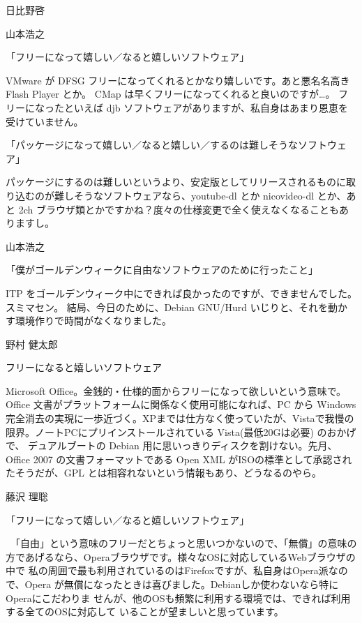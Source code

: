 \documentclass[cjk,dvipdfmx,12pt]{beamer}
\begin{document}
\begin{frame}{日比野啓}
\end{frame}\begin{frame}{山本浩之}

「フリーになって嬉しい／なると嬉しいソフトウェア」

VMware が DFSG フリーになってくれるとかなり嬉しいです。あと悪名名高き Flash Player とか。
CMap は早くフリーになってくれると良いのですが…。
フリーになったといえば djb ソフトウェアがありますが、私自身はあまり恩恵を受けていません。

「パッケージになって嬉しい／なると嬉しい／するのは難しそうなソフトウェア」

パッケージにするのは難しいというより、安定版としてリリースされるものに取り込むのが難しそうなソフトウェアなら、youtube-dl とか
nicovideo-dl とか、あと 2ch ブラウザ類とかですかね？度々の仕様変更で全く使えなくなることもありますし。

\end{frame}\begin{frame}{山本浩之}

「僕がゴールデンウィークに自由なソフトウェアのために行ったこと」

ITP をゴールデンウィーク中にできれば良かったのですが、できませんでした。スミマセン。
結局、今日のために、Debian GNU/Hurd いじりと、それを動かす環境作りで時間がなくなりました。


\end{frame}\begin{frame}{野村 健太郎}

フリーになると嬉しいソフトウェア

Microsoft Office。金銭的・仕様的面からフリーになって欲しいという意味で。
Office 文書がプラットフォームに関係なく使用可能になれば、PC から Windows
完全消去の実現に一歩近づく。XPまでは仕方なく使っていたが、Vistaで我慢の
限界。ノートPCにプリインストールされている Vista(最低20Gは必要) のおかげで、
デュアルブートの Debian 用に思いっきりディスクを割けない。先月、Office 2007
の文書フォーマットである Open XML がISOの標準として承認されたそうだが、GPL
とは相容れないという情報もあり、どうなるのやら。

\end{frame}\begin{frame}{藤沢 理聡}

「フリーになって嬉しい／なると嬉しいソフトウェア」

　「自由」という意味のフリーだとちょっと思いつかないので、「無償」の意味の
方であげるなら、Operaブラウザです。様々なOSに対応しているWebブラウザの中で
私の周囲で最も利用されているのはFirefoxですが、私自身はOpera派なので、Opera
が無償になったときは喜びました。Debianしか使わないなら特にOperaにこだわりま
せんが、他のOSも頻繁に利用する環境では、できれば利用する全てのOSに対応して
いることが望ましいと思っています。


\end{frame}
\end{document}
